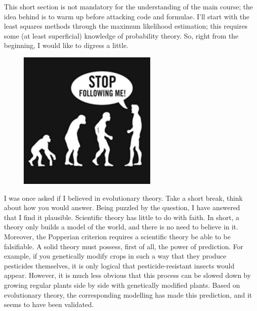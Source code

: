 \documentclass[notitlepage]{report}
\begin{document}
This short section is not mandatory for the understanding of the main course; 
the idea behind is to warm up before attacking code and formulae.
I’ll start with the least squares methods through the maximum likelihood estimation;
this requires some (at least superficial) knowledge of probability theory. 
So, right from the beginning, I would like to digress a little.


\begin{figure}
\includegraphics[width=\linewidth]{stop-following-me.png}
\end{figure}
I was once asked if I believed in evolutionary theory. 
Take a short break, think about how you would answer.
Being puzzled by the question, I have answered that I find it plausible. 
Scientific theory has little to do with faith.
In short, a theory only builds a model of the world, and there is no need to believe in it.
Moreover, the Popperian criterion\cite{} requires a scientific theory be able to be falsifiable. 
A solid theory must possess, first of all, the power of prediction.
For example, if you genetically modify crops in such a way that they produce pesticides themselves, 
it is only logical that pesticide-resistant insects would appear. 
However, it is much less obvious that this process can be slowed down by growing regular plants side by side with genetically modified plants. 
Based on evolutionary theory, the corresponding modelling has made this prediction\cite{}, and it seems to have been validated\cite{}.
\end{document}

